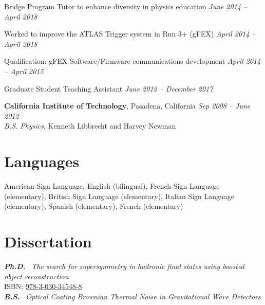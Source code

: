 \documentclass[margin,line]{resume}
\let\origsection\section%
\let\section\subsection%
\let\section\origsection%
\begin{document}
\begin{resume}
\begin{list2}
  \item Bridge Program Tutor to enhance diversity in physics education \hfill \textsl{June 2014 -- April 2018}
  \item Worked to improve the ATLAS Trigger system in Run 3+ (gFEX)  \hfill \textsl{April 2014 -- April 2018}
  \item Qualification: gFEX Software/Firmware communications development \hfill \textsl{April 2014 -- April 2015}
  \item Graduate Student Teaching Assistant \hfill \textsl{June 2012 -- December 2017}
\end{list2}

%
\textbf{California Institute of Technology}, Pasadena, California \hfill \textsl{ Sep 2008 -- June 2012}\\
\textsl{B.S. Physics}, Kenneth Libbrecht and Harvey Newman

\section{\mysidestyle Languages}

American Sign Language, English (bilingual), French Sign Language (elementary), British Sign Language (elementary), Italian Sign Language (elementary), Spanish (elementary), French (elementary)

\section{\mysidestyle Dissertation}

\textbf{\textsl{Ph.D.}} \href{https://kratsg.github.io/thesis/?utm_source=cv}{}~\textsl{The search for supersymmetry in hadronic final states using boosted object reconstruction}\\
ISBN: \href{https://books.google.com/books?vid=ISBN978-3-030-34548-8}{978-3-030-34548-8}\\[2.5mm]
\textbf{\textsl{B.S.}}\hspace{3mm} \href{https://www.dropbox.com/s/h0mpop96cn563bq/Thesis.pdf?dl=0}{}~\textsl{Optical Coating Brownian Thermal Noise in Gravitational Wave Detectors}


\end{resume}
\end{document}
